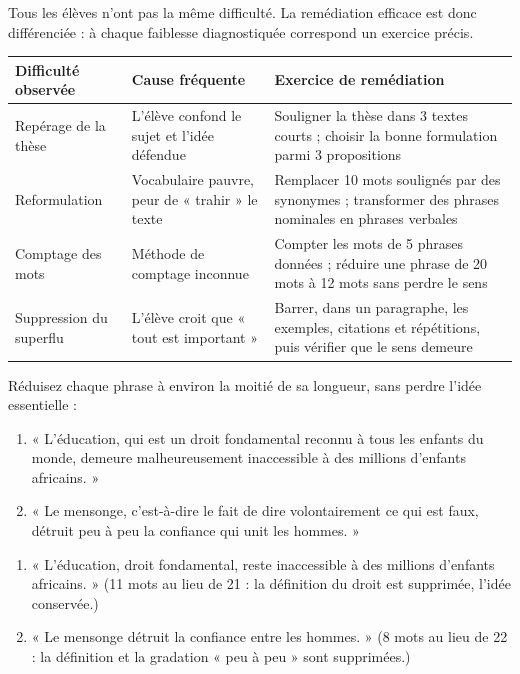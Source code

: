 \documentclass[11pt]{article}
\newcommand{\cle}[1]{{\popxbold\color{popdark}#1}}
\begin{document}
Tous les élèves n'ont pas la même difficulté. La remédiation efficace est donc \cle{différenciée} : à chaque faiblesse diagnostiquée correspond un exercice précis.

\begin{center}
\begin{tabularx}{\linewidth}{|l|X|X|}
\hline
\rowcolor{popblueL} \textbf{Difficulté observée} & \textbf{Cause fréquente} & \textbf{Exercice de remédiation} \\
\hline
Repérage de la thèse & L'élève confond le sujet et l'idée défendue & Souligner la thèse dans 3 textes courts ; choisir la bonne formulation parmi 3 propositions \\
\hline
Reformulation & Vocabulaire pauvre, peur de « trahir » le texte & Remplacer 10 mots soulignés par des synonymes ; transformer des phrases nominales en phrases verbales \\
\hline
Comptage des mots & Méthode de comptage inconnue & Compter les mots de 5 phrases données ; réduire une phrase de 20 mots à 12 mots sans perdre le sens \\
\hline
Suppression du superflu & L'élève croit que « tout est important » & Barrer, dans un paragraphe, les exemples, citations et répétitions, puis vérifier que le sens demeure \\
\hline
\end{tabularx}
\end{center}

\begin{exercice}
Réduisez chaque phrase à environ la moitié de sa longueur, sans perdre l'idée essentielle :
\begin{enumerate}
\item « L'éducation, qui est un droit fondamental reconnu à tous les enfants du monde, demeure malheureusement inaccessible à des millions d'enfants africains. »
\item « Le mensonge, c'est-à-dire le fait de dire volontairement ce qui est faux, détruit peu à peu la confiance qui unit les hommes. »
\end{enumerate}
\end{exercice}

\begin{corrige}
\begin{enumerate}
\item « L'éducation, droit fondamental, reste inaccessible à des millions d'enfants africains. » (11 mots au lieu de 21 : la définition du droit est supprimée, l'idée conservée.)
\item « Le mensonge détruit la confiance entre les hommes. » (8 mots au lieu de 22 : la définition et la gradation « peu à peu » sont supprimées.)
\end{enumerate}
\end{corrige}
\end{document}

